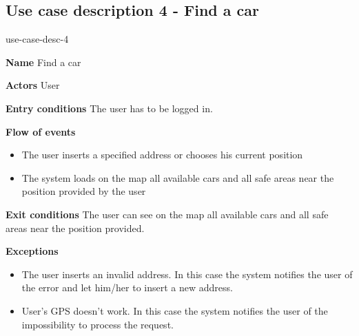 \subsection{Use case description 4 - Find a car}
\begin{labeling}{use-case-desc-4}
	\item[\textbf{Name}] Find a car
	\item[\textbf{Actors}] User
	\item[\textbf{Entry conditions}] The user has to be logged in.
	\item[\textbf{Flow of events}]
		\begin{itemize}
			\item[]
			\item The user inserts a specified address or chooses his current position
			\item The system loads on the map all available cars and all safe areas near the position provided by the user
		\end{itemize}
	\item[\textbf{Exit conditions}] The user can see on the map all available cars and all safe areas near the position provided. 
	\item[\textbf{Exceptions}]
		\begin{itemize}
			\item[]
			\item The user inserts an invalid address. In this case the system notifies the user of the error and let him/her to insert a new address.
			\item User’s GPS doesn’t work. In this case the system notifies the user of the impossibility to process the request.
		\end{itemize}
\end{labeling}

